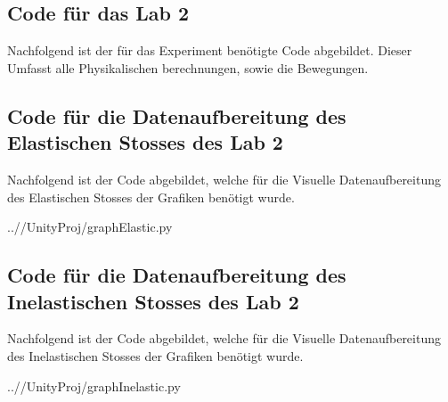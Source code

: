 \documentclass[../main.tex]{subfiles}
\begin{document}
    \subsection{Code für das Lab 2}
    Nachfolgend ist der für das Experiment benötigte Code abgebildet.
    Dieser Umfasst alle Physikalischen berechnungen, sowie die Bewegungen.

    
    \begin{lstinputlisting}[label={lst:CubeController}]
        {\cubeControllerFiles}
    \end{lstinputlisting}

    \subsection{Code für die Datenaufbereitung des Elastischen Stosses des Lab 2}
    Nachfolgend ist der Code abgebildet, welche für die Visuelle Datenaufbereitung des Elastischen Stosses
    der Grafiken benötigt wurde.
    \begin{lstinputlisting}[label={lst:Elastischen}]
    {..//UnityProj/graphElastic.py}
    \end{lstinputlisting}

    \subsection{Code für die Datenaufbereitung des Inelastischen Stosses des Lab 2}
    Nachfolgend ist der Code abgebildet, welche für die Visuelle Datenaufbereitung des Inelastischen Stosses
    der Grafiken benötigt wurde.
    \begin{lstinputlisting}[label={lst:graphInelastic}]
        {..//UnityProj/graphInelastic.py}
    \end{lstinputlisting}
\end{document}
